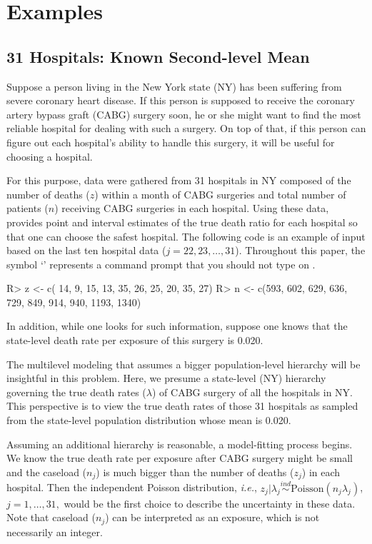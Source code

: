 \documentclass[article]{jss}
\begin{document}
\section[Examples]{Examples}
\subsection[Known Second-level Mean]{31 Hospitals: Known Second-level Mean}
Suppose a person living in the New York state (NY) has been suffering from severe coronary heart disease. If this person is supposed to receive the coronary artery bypass graft (CABG) surgery soon, he or she might want to find the most reliable hospital for dealing with such a surgery. On top of that, if this person can figure out each hospital's ability to handle this surgery, it will be useful for choosing a hospital. 


For this purpose, data were gathered from 31 hospitals in NY composed of the number of deaths ($z$) within a month of CABG surgeries and total number of patients ($n$) receiving CABG surgeries in each hospital. Using these data,  provides point and interval estimates of the true death ratio for each hospital so that one can choose the safest hospital. The following code is an example of input based on the last ten hospital data ($j=22, 23, \ldots, 31$). Throughout this paper, the symbol `' represents a command prompt that you should not type on .
\begin{CodeChunk}
\begin{CodeInput}
R> z <- c( 14,   9,  15,  13,  35,  26,  25,  20,   35,   27)
R> n <- c(593, 602, 629, 636, 729, 849, 914, 940, 1193, 1340)
\end{CodeInput}
\end{CodeChunk}

In addition, while one looks for such information, suppose one knows that the state-level death rate per exposure of this surgery is 0.020. 


The multilevel modeling that assumes a bigger population-level hierarchy will be insightful in this problem. Here, we presume a state-level (NY) hierarchy governing the true death rates ($\lambda$) of CABG surgery of all the hospitals in NY. This perspective is to view the true death rates of those 31 hospitals as sampled from the state-level population distribution whose mean is 0.020. 


Assuming an additional hierarchy is reasonable, a model-fitting process begins.  We know the true death rate per exposure after CABG surgery might be small and the caseload ($n_{j}$) is much bigger than the number of deaths ($z_{j}$) in each hospital. Then the independent Poisson distribution, \emph{i.e.},  $z_{j}\vert \lambda_{j}\stackrel{ind}{\sim} \textrm{Poisson}(n_{j}\lambda_{j})$, $j=1, \ldots, 31,$ would be the first choice to describe the uncertainty in these data. Note that caseload  ($n_{j}$) can be interpreted as an exposure, which is not necessarily an integer.
\end{document}
